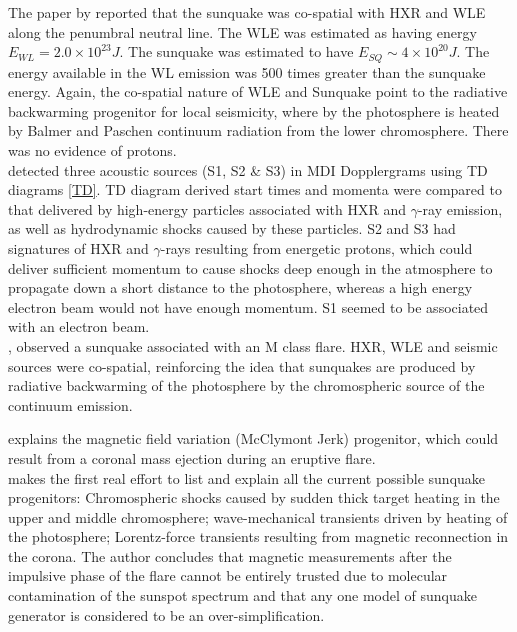 The paper by \cite{2007MNRAS.374.1155M} reported that the sunquake was co-spatial with HXR and WLE along the penumbral neutral line. The WLE was estimated as having energy $E_{WL}=2.0\times10^{23}J$. The sunquake was estimated to have $E_{SQ}\sim4\times10^{20}J$. The energy available in the WL emission was 500 times greater than the sunquake energy. Again, the co-spatial nature of WLE and Sunquake point to the radiative backwarming progenitor for local seismicity, where by the photosphere is heated by Balmer and Paschen continuum radiation from the lower chromosphere. There was no evidence of protons.  \\

\cite{2007ApJ...664..573Z} detected three acoustic sources (S1, S2 \& S3) in MDI Dopplergrams using TD diagrams \ref{TD}. TD diagram derived start times and momenta were compared to that delivered by high-energy particles associated with HXR and $\gamma$-ray emission, as well as hydrodynamic shocks caused by these particles. S2 and S3 had signatures of HXR and $\gamma$-rays resulting from energetic protons, which could deliver sufficient momentum to cause shocks deep enough in the atmosphere to propagate down a short distance to the photosphere, whereas a high energy electron beam would not have enough momentum. S1 seemed to be associated with an electron beam.\\

\cite{2007SoPh..245..121M}, observed a sunquake associated with an M class flare. HXR, WLE and seismic sources were co-spatial, reinforcing the idea that sunquakes are produced by radiative backwarming of the photosphere by the chromospheric source of the continuum emission. 


\cite{2008ASPC..383..221H} explains the magnetic field variation (McClymont Jerk) progenitor, which could result from  a coronal mass ejection during an eruptive flare.  \\

\cite{2008SoPh..251..627L} makes the first real effort to list and explain all the current possible sunquake progenitors:
Chromospheric shocks caused by sudden thick target heating in the upper and middle chromosphere; wave-mechanical transients driven by heating of the photosphere; Lorentz-force transients resulting from magnetic reconnection in the corona. The author concludes that magnetic measurements after the impulsive phase of the flare cannot be entirely trusted due to molecular contamination of the sunspot spectrum and that any one model of sunquake generator is considered to be an over-simplification. \\

